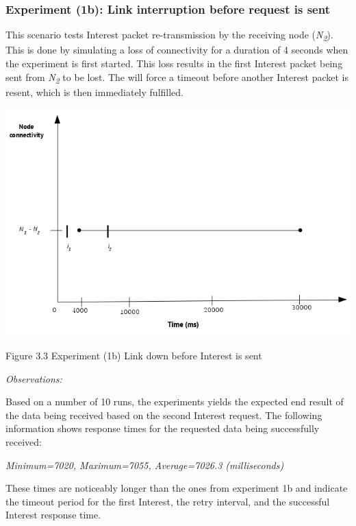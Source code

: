 \documentclass[a4paper,12pt]{report}      %
\begin{document}
\subsubsection{Experiment (1b): Link interruption before request is sent}

This scenario tests Interest packet re-transmission by the receiving node (\emph{N\textsubscript{2}}). This is done by simulating a
loss of connectivity for a duration of 4 seconds when the experiment is first started. This loss results in
the first Interest packet being sent from \emph{N\textsubscript{2}} to be lost. The will force a timeout before 
another Interest packet is resent, which is then immediately fulfilled.

\noindent\includegraphics[scale=0.55]{exp1b_timediag.jpg}\newline
\begin{center}Figure 3.3 Experiment (1b) Link down before Interest is sent\end{center}

\vspace*{1\baselineskip}\noindent\emph{Observations:}

Based on a number of 10 runs, the experiments yields the expected end result of the data being received
based on the second Interest request. The following information shows response times for the requested
data being successfully received:
\begin{center}\textsl{Minimum=7020, Maximum=7055, Average=7026.3 (milliseconds)}\end{center}

These times are noticeably longer than the ones from experiment 1b and indicate the timeout period for
the first Interest, the retry interval, and the successful Interest response time.
\end{document}
